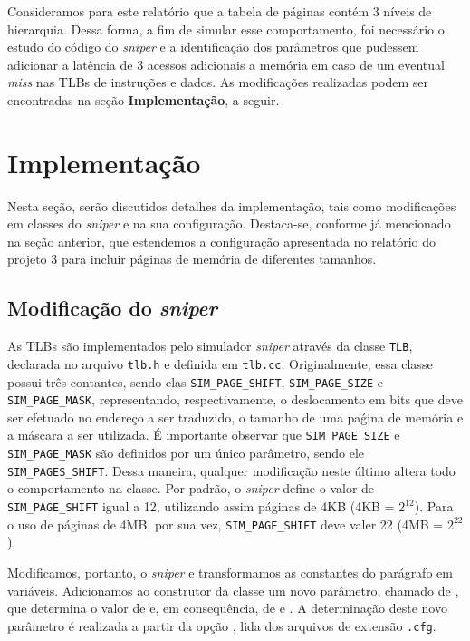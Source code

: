 \documentclass[12pt]{article}
\begin{document}
Consideramos para este relatório que a tabela de páginas contém 3 níveis de
hierarquia. Dessa forma, a fim de simular esse comportamento, foi necessário
o estudo do código do \textit{sniper} e a identificação dos parâmetros que
pudessem adicionar a latência de 3 acessos adicionais a memória em caso de um
eventual \textit{miss} nas TLBs de instruções e dados. As modificações
realizadas podem ser encontradas na seção \textbf{Implementação}, a seguir.

\section {Implementação}

Nesta seção, serão discutidos detalhes da implementação, tais como modificações
em classes do \textit{sniper} e na sua configuração. Destaca-se, conforme já
mencionado na seção anterior, que estendemos a configuração apresentada no
relatório do projeto 3 \cite{relatorio3} para incluir páginas de memória de
diferentes tamanhos.

\subsection{Modificação do \textit{sniper}}

As TLBs são implementados pelo simulador \textit{sniper} através da classe
\texttt{TLB}, declarada no arquivo \texttt{tlb.h} e definida em \texttt{tlb.cc}.
Originalmente, essa classe possui três contantes, sendo elas
\texttt{SIM\_PAGE\_SHIFT}, \texttt{SIM\_PAGE\_SIZE} e \texttt{SIM\_PAGE\_MASK},
representando, respectivamente, o deslocamento em bits que deve ser efetuado no
endereço a ser traduzido, o tamanho de uma paǵina de memória e a máscara a ser
utilizada. É importante observar que \texttt{SIM\_PAGE\_SIZE} e
\texttt{SIM\_PAGE\_MASK} são definidos por um único parâmetro, sendo ele
\texttt{SIM\_PAGES\_SHIFT}. Dessa maneira, qualquer modificação neste último
altera todo o comportamento na classe. Por padrão, o \textit{sniper} define o
valor de \texttt{SIM\_PAGE\_SHIFT} igual a 12, utilizando
assim páginas de 4KB (4KB = \(2^{12}\)). Para o uso de páginas de 4MB, por sua
vez,  \texttt{SIM\_PAGE\_SHIFT} deve valer 22 (4MB = \(2^{22}\)).

Modificamos, portanto, o \textit{sniper} e transformamos as constantes do
parágrafo em variáveis. Adicionamos ao construtor da classe um novo parâmetro,
chamado de , que determina o valor de
 e, em consequência, de  e
. A determinação deste novo parâmetro é realizada a partir
da opção , lida dos arquivos de extensão \texttt{.cfg}.
\end{document}
